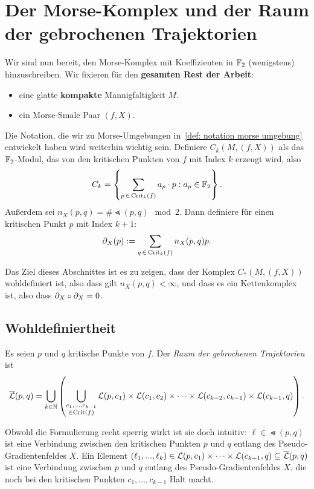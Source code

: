 \section{Der Morse-Komplex und der Raum der gebrochenen Trajektorien}

Wir sind nun bereit, den Morse-Komplex mit Koeffizienten in ${ \mathbb F }_2$ (wenigstens) hinzuschreiben.
Wir fixieren für den \textbf{gesamten Rest der Arbeit}: 
\begin{itemize}
    \item eine glatte \textbf{kompakte} Mannigfaltigkeit $M$.
    \item ein Morse-Smale Paar $(f, X)$.
\end{itemize}
Die Notation, die wir zu Morse-Umgebungen in~\ref{def: notation morse umgebung} entwickelt haben 
wird weiterhin wichtig sein. Definiere $C_k (M, (f, X))$ als das ${ \mathbb F }_2$-Modul, 
das von den kritischen Punkten von $f$ mit Index $k$ erzeugt wird, also
\[ C_k = \left\{ \sum_{p \, \in \, { \operatorname{Crit} }_k (f)} a_p \cdot p : a_p \in { \mathbb F }_2 \right\} . \] 
Außerdem sei 
$n_X(p, q) = \# \Lt (p, q) \mod 2$. Dann definiere für einen kritischen Punkt $p$ mit Index $k + 1$:
\[ { \partial }_X (p) := \sum_{q \, \in \, { \operatorname{Crit} }_{k}(f)} n_X(p, q)p . \]

Das Ziel dieses Abschnittes ist es zu zeigen, dass der Komplex $C_{\ast}(M, (f, X))$ wohldefiniert
ist, also dass gilt $n_X (p, q) < \infty$, und dass es ein Kettenkomplex ist, also dass 
${ \partial }_X \circ { \partial }_X = 0$. 

\subsection*{Wohldefiniertheit}

\begin{definition}
    \label{def: raum der gebrochenen trajektorien}
    Es seien $p$ und $q$ kritische Punkte von $f$. Der \textit{Raum der gebrochenen Trajektorien} ist
    \[ {\overline{\mathcal{L}} } (p, q) = 
        \bigcup_{k \in { \mathbb N }} \left( \bigcup_{\substack{c_1, \dots, c_{k - 1} \\ \in { \operatorname{Crit} }(f)}} 
            { \mathcal{L} } (p, c_1) \times { \mathcal{L} } (c_1, c_2) \times \dots 
                \times { \mathcal{L} } (c_{k - 2}, c_{k - 1}) \times { \mathcal{L} } (c_{k - 1}, q) \right) . \]
\end{definition}

Obwohl die Formulierung recht sperrig wirkt ist sie doch intuitiv: 
$\ell \in \Lt (p, q)$ ist eine \glqq Verbindung\grqq{} zwischen den kritischen Punkten $p$ und $q$ 
entlang des Pseudo-Gradientenfeldes $X$. Ein Element 
$(\ell_1, ..., \ell_k) \in { \mathcal{L} } (p, c_1) \times \dots \times { \mathcal{L} } (c_{k - 1}, q) \subseteq {\overline{\mathcal{L}} } (p, q)$
ist eine \glqq Verbindung\grqq{} zwischen $p$ und $q$ entlang des Pseudo-Gradientenfeldes $X$, die noch 
bei den kritischen Punkten $c_1, \dots, c_{k - 1}$ \glqq Halt\grqq{} macht. 

